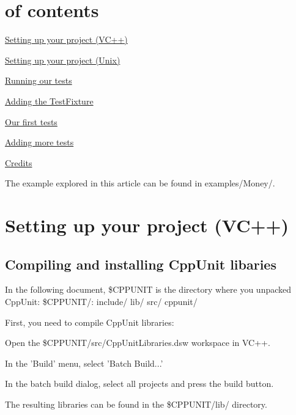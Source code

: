 \hypertarget{money_example_Table}{}\section{of contents}\label{money_example_Table}

\begin{DoxyItemize}
\item \hyperlink{money_example_sec_setting_vc}{Setting up your project (V\+C++)}
\item \hyperlink{money_example_sec_setting_unix}{Setting up your project (Unix)}
\item \hyperlink{money_example_sec_running_test}{Running our tests}
\item \hyperlink{money_example_sec_adding_testfixture}{Adding the Test\+Fixture}
\item \hyperlink{money_example_sec_first_tests}{Our first tests}
\item \hyperlink{money_example_sec_more_tests}{Adding more tests}
\item \hyperlink{money_example_sec_credits}{Credits}
\end{DoxyItemize}

The example explored in this article can be found in {\ttfamily examples/\+Money/}.\hypertarget{money_example_sec_setting_vc}{}\section{Setting up your project (\+V\+C++)}\label{money_example_sec_setting_vc}
\hypertarget{money_example_sec_install}{}\subsection{Compiling and installing Cpp\+Unit libaries}\label{money_example_sec_install}
In the following document, \$\+C\+P\+P\+U\+N\+I\+T is the directory where you unpacked Cpp\+Unit\+: \$\+C\+P\+P\+U\+N\+I\+T/\+: include/ lib/ src/ cppunit/

First, you need to compile Cpp\+Unit libraries\+:
\begin{DoxyItemize}
\item Open the \$\+C\+P\+P\+U\+N\+I\+T/src/\+Cpp\+Unit\+Libraries.dsw workspace in V\+C++.
\item In the 'Build' menu, select 'Batch Build...'
\item In the batch build dialog, select all projects and press the build button.
\item The resulting libraries can be found in the \$\+C\+P\+P\+U\+N\+I\+T/lib/ directory.
\end{DoxyItemize}

